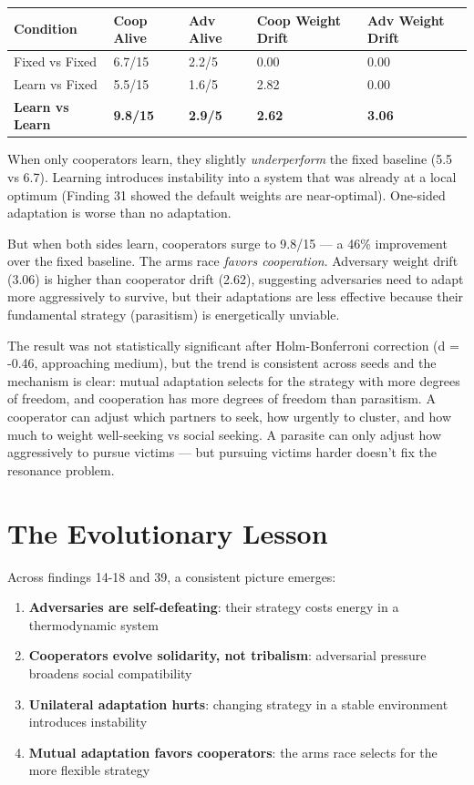 \begin{longtable}[]{@{}lllll@{}}
\toprule\noalign{}
Condition & Coop Alive & Adv Alive & Coop Weight Drift & Adv Weight Drift \\
\midrule\noalign{}
\endhead
\bottomrule\noalign{}
\endlastfoot
Fixed vs Fixed & 6.7/15 & 2.2/5 & 0.00 & 0.00 \\
Learn vs Fixed & 5.5/15 & 1.6/5 & 2.82 & 0.00 \\
\textbf{Learn vs Learn} & \textbf{9.8/15} & \textbf{2.9/5} & \textbf{2.62} & \textbf{3.06} \\
\end{longtable}

When only cooperators learn, they slightly \emph{underperform} the fixed baseline (5.5 vs 6.7). Learning introduces instability into a system that was already at a local optimum (Finding 31 showed the default weights are near-optimal). One-sided adaptation is worse than no adaptation.

But when both sides learn, cooperators surge to 9.8/15 --- a 46\% improvement over the fixed baseline. The arms race \emph{favors cooperation}. Adversary weight drift (3.06) is higher than cooperator drift (2.62), suggesting adversaries need to adapt more aggressively to survive, but their adaptations are less effective because their fundamental strategy (parasitism) is energetically unviable.

The result was not statistically significant after Holm-Bonferroni correction (d = -0.46, approaching medium), but the trend is consistent across seeds and the mechanism is clear: mutual adaptation selects for the strategy with more degrees of freedom, and cooperation has more degrees of freedom than parasitism. A cooperator can adjust which partners to seek, how urgently to cluster, and how much to weight well-seeking vs social seeking. A parasite can only adjust how aggressively to pursue victims --- but pursuing victims harder doesn't fix the resonance problem.

\section{The Evolutionary Lesson}\label{the-evolutionary-lesson}

Across findings 14-18 and 39, a consistent picture emerges:

\begin{enumerate}
\def\labelenumi{\arabic{enumi}.}
\tightlist
\item
  \textbf{Adversaries are self-defeating}: their strategy costs energy in a thermodynamic system
\item
  \textbf{Cooperators evolve solidarity, not tribalism}: adversarial pressure broadens social compatibility
\item
  \textbf{Unilateral adaptation hurts}: changing strategy in a stable environment introduces instability
\item
  \textbf{Mutual adaptation favors cooperators}: the arms race selects for the more flexible strategy
\end{enumerate}

